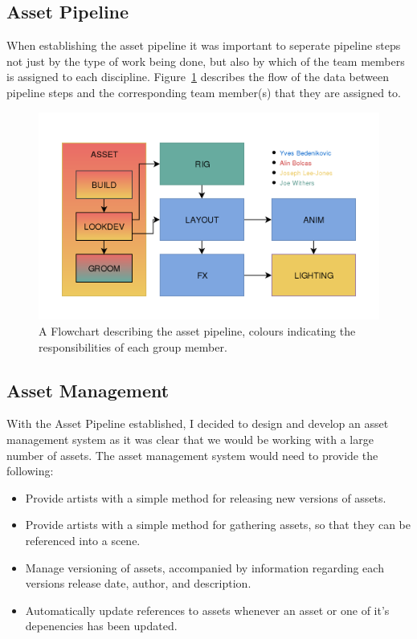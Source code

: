 \documentclass[11pt]{article}
\begin{document}
\subsection{Asset Pipeline}

When establishing the asset pipeline it was important to seperate pipeline steps not just by the type of work being done, but also by which of the team members is assigned to each discipline. Figure~\ref{figure:pipelineFlow} describes the flow of the data between pipeline steps and the corresponding team member(s) that they are assigned to.

\begin{figure}[htbp]\centering
	\includegraphics[width=1.0\linewidth]{images/pipeline.png}
	\caption{\label{figure:pipelineFlow} A Flowchart describing the asset pipeline, colours indicating the responsibilities of each group member.}
\end{figure}

\subsection{Asset Management}

With the Asset Pipeline established, I decided to design and develop an asset management system as it was clear that we would be working with a large number of assets. The asset management system would need to provide the following:

\begin{itemize}

\item Provide artists with a simple method for releasing new versions of assets.

\item Provide artists with a simple method for gathering assets, so that they can be referenced into a scene.

\item Manage versioning of assets, accompanied by information regarding each versions release date, author, and  description.

\item Automatically update references to assets whenever an asset or one of it's depenencies has been updated.

\end{itemize}
\end{document}
